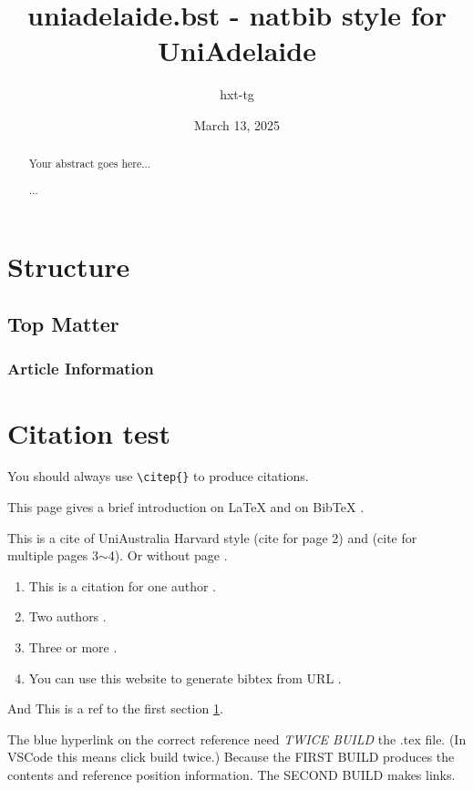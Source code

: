 \documentclass[a4paper]{article}
\title{uniadelaide.bst - natbib style for UniAdelaide}
\author{hxt-tg}
\date{March 13, 2025}
\begin{document}
\maketitle

\begin{abstract}
    Your abstract goes here...

    ...
\end{abstract}

{\hypersetup{hidelinks} \tableofcontents} %

\section{Structure}
\label{sec:structure}  %

\lipsum[1-2]

\subsection{Top Matter}

\lipsum[3-4]

\subsubsection{Article Information}

\lipsum[5-6]

\section{Citation test}

You should always use \verb|\citep{}| to produce citations.

This page gives a brief introduction on LaTeX \citep{wikibooksLaTeXDocStruct} and on BibTeX \citep{overleafBibTeX}.

This is a cite of UniAustralia Harvard style \citep[p.~2]{vaswani2017attention} (cite for page 2) and \citep[pp.~3-4]{vaswani2017attention} (cite for multiple pages 3$\sim$4). Or without page \citep{vaswani2017attention}.

\begin{enumerate}
    \item This is a citation for one author \citep{ticker2017music}.
    \item Two authors \citep{habel2009academic}.
    \item Three or more \citep{mnih2015human}.
    \item You can use this website to generate bibtex from URL \citep{getbibtexBibTeXGenerator}.
\end{enumerate}

And This is a ref to the first section \ref{sec:structure}. 

The blue hyperlink on the correct reference need \emph{TWICE BUILD} the .tex file. (In VSCode this means click build twice.) Because the FIRST BUILD produces the contents and reference position information. The SECOND BUILD makes links.


\end{document}
